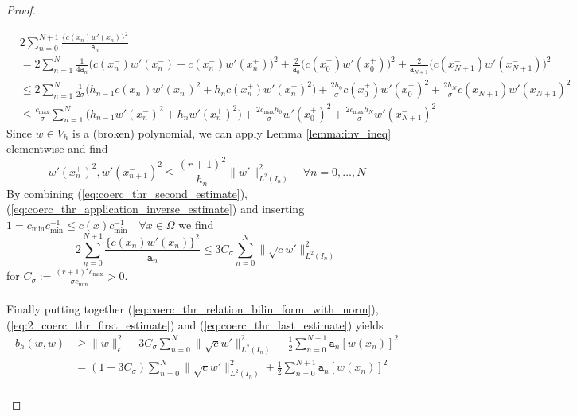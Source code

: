 \begin{proof}
\begin{proofstep}[Coercivity]
		\begin{align}
			\label{eq:coerc_thr_second_estimate}
			 & 2\sum_{n=0}^{N+1} \frac{\{c(x_n)w'(x_n)\}^2}{\texttt{a}_n} \nonumber        \\
			 & = 2\sum_{n=1}^{N} \frac{1}{4\texttt{a}_n}
			\Big( c(x_n^-)w'(x_n^-) + c(x_n^+)w'(x_n^+) \Big)^2 + \frac{2}{\texttt{a}_0} \Big( c(x_0^+)w'(x_0^+) \Big)^2
			+ \frac{2}{\texttt{a}_{N+1}} \Big( c(x_{N+1}^-)w'(x_{N+1}^-) \Big)^2 \nonumber \\
			 & \leq 2\sum_{n=1}^{N} \frac{1}{2\sigma}
			\Big( h_{n-1}c(x_n^-)w'(x_n^-)^2 + h_{n}c(x_n^+)w'(x_n^+)^2 \Big) + \frac{2h_0}{\sigma} c(x_0^+)w'(x_0^+)^2
			+ \frac{2h_{N}}{\sigma} c(x_{N+1}^-)w'(x_{N+1}^-)^2 \nonumber                  \\
			 & \leq \frac{c_{\max}}{\sigma}\sum_{n=1}^{N}
			\Big(h_{n-1}w'(x_n^-)^2 + h_{n}w'(x_n^+)^2 \Big) + \frac{2c_{\max}h_0}{\sigma} w'(x_0^+)^2
			+ \frac{2c_{\max}h_{N}}{\sigma} w'(x_{N+1}^-)^2
		\end{align}
		Since $w\in V_h$ is a (broken) polynomial, we can apply Lemma \ref{lemma:inv_ineq} elementwise and find
		\begin{equation}
			\label{eq:coerc_thr_application_inverse_estimate}
			w'(x_n^+)^2,w'(x_{n+1}^-)^2  \leq \frac{(r+1)^2}{h_n} \|w'\|_{L^2(I_n)}^2 \quad \forall n = 0,\ldots,N
		\end{equation}
		By combining (\ref{eq:coerc_thr_second_estimate}), (\ref{eq:coerc_thr_application_inverse_estimate}) and
		inserting $1 = c_{\min}c_{\min}^{-1} \leq c(x)c_{\min}^{-1} \quad \forall x\in\Omega$ we find
		\begin{equation}
			\label{eq:coerc_thr_last_estimate}
			2\sum_{n=0}^{N+1} \frac{\{c(x_n)w'(x_n)\}^2}{\texttt{a}_n} \leq
			3C_{\sigma} \sum_{n=0}^{N} \|\sqrt{c}w'\|_{L^2(I_n)}^2
		\end{equation}
		for $\displaystyle C_{\sigma} := \frac{ (r+1)^2 c_{\max} }{\sigma c_{\min}} > 0$. \\ \\
		Finally putting together (\ref{eq:coerc_thr_relation_bilin_form_with_norm}), (\ref{eq:2_coerc_thr_first_estimate}) and
		(\ref{eq:coerc_thr_last_estimate}) yields
		\begin{align*}
			b_h(w,w) & \geq \|w\|_{\epsilon}^2 - 3C_{\sigma} \sum_{n=0}^{N} \|\sqrt{c}w'\|_{L^2(I_n)}^2
			- \frac{1}{2} \sum_{n=0}^{N+1} \texttt{a}_n [w(x_n)]^2 \nonumber                                                                           \\
			         & = (1 - 3C_{\sigma}) \sum_{n=0}^{N} \|\sqrt{c}w'\|_{L^2(I_n)}^2 + \frac{1}{2} \sum_{n=0}^{N+1} \texttt{a}_n [w(x_n)]^2 \nonumber \\

\end{align*}
\end{proofstep}
\end{proof}
